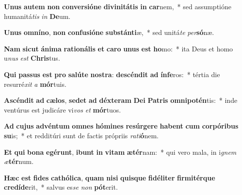 \item \textbf{U}\textbf{nus} \textbf{au}\textbf{tem} \textbf{non} \textbf{con}\textbf{ver}\textbf{si}\textbf{ó}\textbf{ne} \textbf{di}\textbf{vi}\textbf{ni}\textbf{tá}\textbf{tis} \textbf{in} \textbf{car}nem,~* sed assumptióne humanitá\textit{tis} \textit{in} \textbf{De}um.
\item \textbf{U}\textbf{nus} \textbf{om}\textbf{ní}\textbf{no}, \textbf{non} \textbf{con}\textbf{fu}\textbf{si}\textbf{ó}\textbf{ne} \textbf{sub}\textbf{stán}\textbf{ti}æ,~* sed unitá\textit{te} \textit{per}\textbf{só}næ.
\item \textbf{Nam} \textbf{sic}\textbf{ut} \textbf{á}\textbf{ni}\textbf{ma} \textbf{ra}\textbf{ti}\textbf{o}\textbf{ná}\textbf{lis} \textbf{et} \textbf{ca}\textbf{ro} \textbf{u}\textbf{nus} \textbf{est} \textbf{ho}mo:~* ita Deus et homo u\textit{nus} \textit{est} \textbf{Chris}tus.
\item \textbf{Qui} \textbf{pas}\textbf{sus} \textbf{est} \textbf{pro} \textbf{sa}\textbf{lú}\textbf{te} \textbf{nos}\textbf{tra}: \textbf{de}\textbf{scén}\textbf{dit} \textbf{ad} \textbf{ín}\textbf{fe}ros:~* tértia die resurré\textit{xit} \textit{a} \textbf{mór}tuis.
\item \textbf{A}\textbf{scén}\textbf{dit} \textbf{ad} \textbf{cæ}\textbf{los}, \textbf{se}\textbf{det} \textbf{ad} \textbf{déx}\textbf{te}\textbf{ram} \textbf{De}\textbf{i} \textbf{Pa}\textbf{tris} \textbf{om}\textbf{ni}\textbf{pot}\textbf{én}tis:~* inde ventúrus est judicáre vi\textit{vos} \textit{et} \textbf{mór}tuos.
\item \textbf{Ad} \textbf{cu}\textbf{jus} \textbf{ad}\textbf{vén}\textbf{tum} \textbf{om}\textbf{nes} \textbf{hó}\textbf{mi}\textbf{nes} \textbf{re}\textbf{súr}\textbf{ge}\textbf{re} \textbf{ha}\textbf{bent} \textbf{cum} \textbf{cor}\textbf{pó}\textbf{ri}\textbf{bus} \textbf{su}is;~* et redditúri sunt de factis própriis \textit{ra}\textit{ti}\textbf{ó}nem.
\item \textbf{Et} \textbf{qui} \textbf{bo}\textbf{na} \textbf{e}\textbf{gé}\textbf{runt}, \textbf{i}\textbf{bunt} \textbf{in} \textbf{vi}\textbf{tam} \textbf{æ}\textbf{tér}nam:~* qui vero mala, in i\textit{gnem} \textit{æ}\textbf{tér}num.
\item \textbf{Hæc} \textbf{est} \textbf{fi}\textbf{des} \textbf{ca}\textbf{thó}\textbf{li}\textbf{ca}, \textbf{quam} \textbf{ni}\textbf{si} \textbf{quis}\textbf{que} \textbf{fi}\textbf{dé}\textbf{li}\textbf{ter} \textbf{fir}\textbf{mi}\textbf{tér}\textbf{que} \textbf{cre}\textbf{dí}\textbf{de}rit,~* salvus es\textit{se} \textit{non} \textbf{pót}erit.

